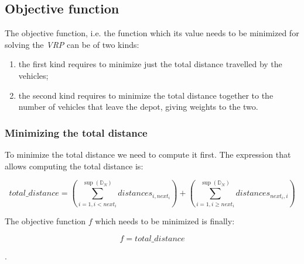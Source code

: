 \documentclass[../main.tex]{subfiles}
\begin{document}
\subsection{Objective function}
The objective function, i.e. the function which its value needs to be minimized for solving the \textit{VRP} can be of two kinds:
\begin{enumerate}
    \item the first kind requires to minimize just the total distance travelled by the vehicles;
    \item the second kind requires to minimize the total distance together to the number of vehicles that leave the depot, giving weights to the two.
\end{enumerate}
\subsubsection{Minimizing the total distance}
To minimize the total distance we need to compute it first. The expression that allows computing the total distance is:
\begin{center}
    \begin{equation}
        total\_distance = (\sum_{i = 1, i < next_i}^{\sup{}(\mathbb{D}_N)}{distances_{i, next_i}}) + (\sum_{i = 1, i \geq next_i}^{\sup{}(\mathbb{D}_N)}{distances_{next_i, i}})
    \end{equation}
\end{center}
The objective function $f$ which needs to be minimized is finally:
\begin{center}
    \begin{equation}
        f = total\_distance
    \end{equation}
\end{center}.
\end{document}
